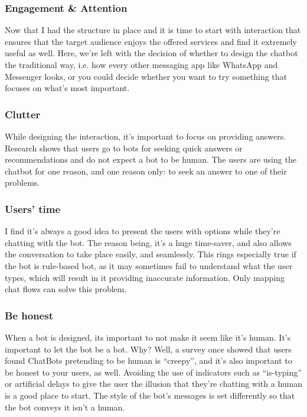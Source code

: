 \documentclass[14pt]{extarticle}
\begin{document}
\subsubsection{Engagement \& Attention}
Now that I had the structure in place and it is time to start with interaction that ensures that the target audience enjoys the offered services and find it extremely useful as well. Here, we're left with the decision of whether to design the chatbot the traditional way, i.e. how every other messaging app like WhatsApp and Messenger looks, or you could decide whether you want to try something that focuses on what's most important.

\subsubsection{Clutter}

While designing the interaction, it's important to focus on providing answers. Research shows that users go to bots for seeking quick answers or recommendations and do not expect a bot to be human. The users are using the chatbot for one reason, and one reason only: to seek an answer to one of their problems.

\subsubsection{Users' time}

I find it's always a good idea to present the users with options while they're chatting with the bot. The reason being, it's a huge time-saver, and also allows the conversation to take place easily, and seamlessly. This rings especially true if the bot is rule-based bot, as it may sometimes fail to understand what the user types, which will result in it providing inaccurate information. Only mapping chat flows can solve this problem.

\subsubsection{Be honest}
When a bot is designed, its important to not make it seem like it's human. It's important to let the bot be a bot. Why? Well, a survey once showed that users found ChatBots pretending to be human is “creepy”, and it's also important to be honest to your users, as well. Avoiding the use of indicators such as “is-typing” or artificial delays to give the user the illusion that they're chatting with a human is a good place to start. The style of the bot's messages is set differently so that the bot conveys it isn't a human.
\end{document}

